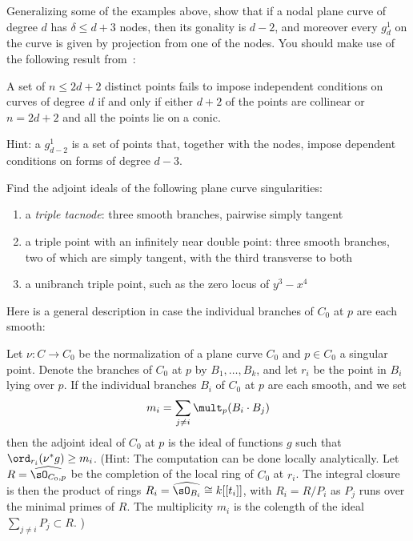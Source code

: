 \begin{exercise}
Generalizing some of the examples above, show that if a nodal plane curve of degree $d$ has $\delta\leq d+3$ nodes,
then its gonality is $d-2$, and moreover every $g^1_d$ on the curve is given by projection from one of the nodes.
You should make use of the following result from~\cite[p. 302]{MR1376653}:
\begin{proposition}
 A set of $n \leq 2d+ 2$ distinct
points fails to impose independent conditions on curves of degree
$d$ if and only if either $d + 2$ of the points  are collinear or $n = 2d + 2$ and all the points lie
on a conic.
\end{proposition} 
Hint: a $g^1_{d-2}$ is a set of points that, together with the nodes, impose dependent conditions on forms of degree $d-3$.
\end{exercise}

\begin{exercise}
Find the adjoint ideals of the following plane curve singularities:
\begin{enumerate}
\item a \emph{triple tacnode}: three smooth branches, pairwise simply tangent
\item a triple point with an infinitely near double point: three smooth branches, two of which are simply tangent, with the third transverse to both
\item a unibranch triple point, such as the zero locus of $y^3-x^4$
\end{enumerate}
\end{exercise}

Here is a  general description in case the individual branches of $C_0$ at $p$ are each smooth:

\begin{exercise}
Let $\nu : C \to C_0$ be the normalization of a plane curve $C_0$ and $p \in C_0$ a singular point. Denote the branches of $C_0$ at $p$ by $B_1,\dots,B_k$, and let $r_i$ be the point in $B_i$ lying over $p$. If the individual branches $B_i$ of $C_0$ at $p$ are each smooth, and we set
$$
m_i = \sum_{j \neq i} \mult_p(B_i \cdot B_j)
$$
then the adjoint ideal of $C_0$ at $p$ is the ideal of functions $g$ such that $\ord_{r_i}(\nu^*g) \geq m_i$.
(Hint: The computation can be done locally analytically. Let $R = \widehat{\sO_{C_0, p}}$ be the completion of the local ring
of $C_0$ at $r_i$. The integral closure is then the product of rings $R_i = \widehat{\sO_{B_i}} \cong k[[t_i]]$,
with $R_i = R/P_i$ as $P_j$ runs over the minimal primes of $R$. The multiplicity
$m_i$ is the colength of the ideal $\sum_{j\neq i}P_j \subset R$.
)
\end{exercise}

